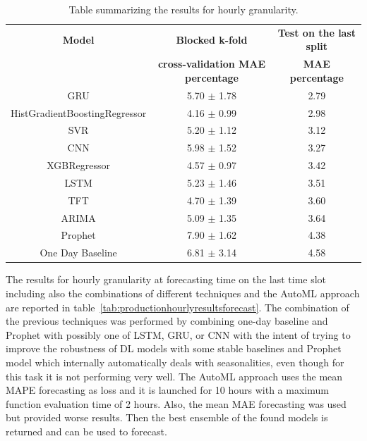 \begin{table}[H]
\centering
\begin{tabular}{|c|c|c|}
\hline
\textbf{Model} & \textbf{Blocked k-fold} & \textbf{Test on the last split}\\
 & \textbf{cross-validation MAE percentage} & \textbf{MAE percentage}\\
\hline
GRU & 5.70 $\pm$ 1.78 & 2.79\\
\hline
HistGradientBoostingRegressor & 4.16 $\pm$ 0.99 & 2.98\\
\hline
SVR & 5.20 $\pm$ 1.12 & 3.12\\
\hline
CNN & 5.98 $\pm$ 1.52 & 3.27\\
\hline
XGBRegressor & 4.57 $\pm$ 0.97 & 3.42\\
\hline
LSTM & 5.23 $\pm$ 1.46 & 3.51\\
\hline
TFT & 4.70 $\pm$ 1.39 & 3.60\\
\hline
ARIMA & 5.09 $\pm$ 1.35 & 3.64\\
\hline
Prophet & 7.90 $\pm$ 1.62 & 4.38\\
\hline
One Day Baseline & 6.81 $\pm$ 3.14 & 4.58\\
\hline
\end{tabular}
\caption{Table summarizing the results for hourly granularity.}
\label{tab:productionhourlyresults}
\end{table}

The results for hourly granularity at forecasting time on the last time slot including also the combinations of different techniques and the AutoML approach are reported in table~\ref{tab:productionhourlyresultsforecast}.
The combination of the previous techniques was performed by combining one-day baseline and Prophet with possibly one of LSTM, GRU, or CNN with the intent of trying to improve the robustness of DL models with some stable baselines and Prophet model which internally automatically deals with seasonalities, even though for this task it is not performing very well.
The AutoML approach uses the mean MAPE forecasting as loss and it is launched for 10 hours with a maximum function evaluation time of 2 hours.
Also, the mean MAE forecasting was used but provided worse results.
Then the best ensemble of the found models is returned and can be used to forecast.

